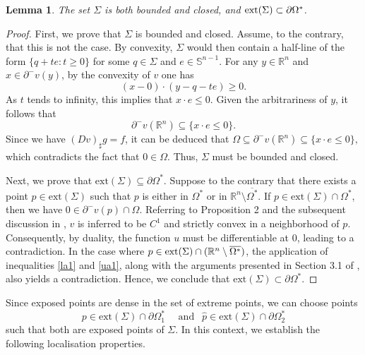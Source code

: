 \documentclass[10pt,a4paper]{amsart}
\theoremstyle{plain}
\newtheorem{lemma}{Lemma}[section]
\newcommand{\0}{\textbf{0}}
\numberwithin{equation}{section}
\numberwithin{equation}{section}
\numberwithin{figure}{section}
\begin{document}
\begin{lemma}\label{sc111}
The set $\Sigma$ is both bounded and closed, and $\text{\normalfont ext}(\Sigma)\subset \partial\Omega^*$.
\end{lemma}

\begin{proof}
First, we prove that $\Sigma$ is bounded and closed. Assume, to the contrary, that this is not the case. 
By convexity, $\Sigma$ would then contain a half-line of the form $\{q + te : t \geq 0\}$ for some $q \in \Sigma$ and $e \in \mathbb{S}^{n-1}$. For any $y \in \mathbb{R}^n$ and $x \in \partial^{-}v(y)$, by the convexity of $v$ one has 
	$$ (x - 0) \cdot (y - q - te) \geq 0. $$ 
As $t$ tends to infinity, this implies that $x \cdot e \leq 0$. 
Given the arbitrariness of $y$, it follows that 
	$$\partial^{-} v(\mathbb{R}^n) \subseteq \{x \cdot e \leq 0\}.$$ 
Since we have $(Dv)_{\sharp}g = f$, it can be deduced that $\Omega \subseteq \partial^{-} v(\mathbb{R}^n) \subseteq \{x \cdot e \leq 0\},$ which contradicts the fact that $0 \in \Omega$. Thus, $\Sigma$ must be bounded and closed.

Next, we prove that $\text{ext}(\Sigma) \subseteq \partial\Omega^*$. Suppose to the contrary that there exists a point $p \in \text{ext}(\Sigma)$ such that $p$ is either in $\Omega^*$ or in $\mathbb{R}^n \setminus \overline{\Omega^*}$. If $p \in \text{ext}(\Sigma) \cap \Omega^*$, then we have $0 \in \partial^{-}v(p) \cap \Omega$. Referring to Proposition 2 and the subsequent discussion in \cite{FK1}, $v$ is inferred to be $C^1$ and strictly convex in a neighborhood of $p$. Consequently, by duality, the function $u$ must be differentiable at $0$, leading to a contradiction. In the case where $p \in \text{\normalfont ext}(\Sigma) \cap (\mathbb{R}^n \setminus \overline{\Omega^*})$, the application of inequalities \eqref{la1} and \eqref{ua1}, along with the arguments presented in Section 3.1 of \cite{FK1}, also yields a contradiction. Hence, we conclude that $\text{ext}(\Sigma) \subset \partial\Omega^*$.
\end{proof}




Since exposed points are dense in the set of extreme points, we can choose points 
	\begin{equation}\label{exppt}
		p\in\text{ext}(\Sigma) \cap \partial\Omega^*_1 \quad \text{ and }\ \  \hat{p} \in  \text{ext}(\Sigma) \cap \partial\Omega^*_2
	\end{equation} 
 such that both are exposed points of \( \Sigma \). In this context, we establish the following localisation properties.
\end{document}
